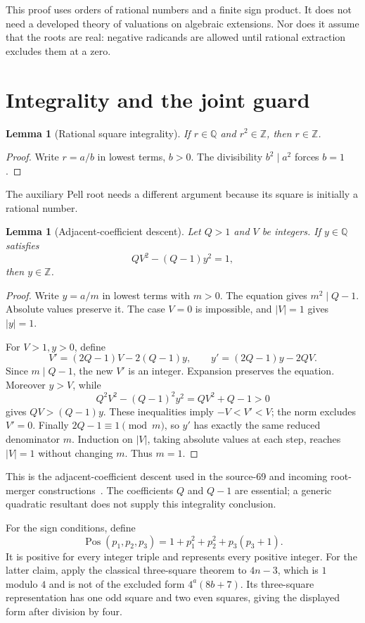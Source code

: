 \documentclass[11pt]{article}
\newtheorem{lemma}[theorem]{Lemma}
\theoremstyle{definition}
\theoremstyle{remark}
\newcommand{\Z}{\mathbb Z}
\newcommand{\Q}{\mathbb Q}
\newcommand{\Pos}{\operatorname{Pos}}
\begin{document}
This proof uses orders of rational numbers and a finite sign product.
It does not need a developed theory of valuations on algebraic
extensions. Nor does it assume that the roots are real: negative
radicands are allowed until rational extraction excludes them at a zero.

\section{Integrality and the joint guard}
\label{sec:integrality}

\begin{lemma}[Rational square integrality]\label{lem:monic}
If \(r\in\Q\) and \(r^2\in\Z\), then \(r\in\Z\).
\end{lemma}
\begin{proof}
Write \(r=a/b\) in lowest terms, \(b>0\). The divisibility
\(b^2\mid a^2\) forces \(b=1\).
\end{proof}

The auxiliary Pell root needs a different argument because its square
is initially a rational number.

\begin{lemma}[Adjacent-coefficient descent]\label{lem:descent}
Let \(Q>1\) and \(V\) be integers. If \(y\in\Q\) satisfies
\[
 QV^2-(Q-1)y^2=1,
\]
then \(y\in\Z\).
\end{lemma}
\begin{proof}
Write \(y=a/m\) in lowest terms with \(m>0\). The equation gives
\(m^2\mid Q-1\). Absolute values preserve it. The case \(V=0\) is
impossible, and \(|V|=1\) gives \(|y|=1\).

For \(V>1,y>0\), define
\[
 V'=(2Q-1)V-2(Q-1)y,\qquad
 y'=(2Q-1)y-2QV.
\]
Since \(m\mid Q-1\), the new \(V'\) is an integer. Expansion preserves
the equation. Moreover \(y>V\), while
\[
 Q^2V^2-(Q-1)^2y^2=QV^2+Q-1>0
\]
gives \(QV>(Q-1)y\). These inequalities imply \(-V<V'<V\); the norm
excludes \(V'=0\). Finally \(2Q-1\equiv1\pmod m\), so \(y'\) has exactly
the same reduced denominator \(m\). Induction on \(|V|\), taking absolute
values at each step, reaches \(|V|=1\) without changing \(m\). Thus \(m=1\).
\end{proof}

This is the adjacent-coefficient descent used in the source-69 and
incoming root-merger constructions~\cite{incomingradical}. The coefficients
\(Q\) and \(Q-1\) are essential; a generic quadratic resultant does not
supply this integrality conclusion.

For the sign conditions, define
\[
 \Pos(p_1,p_2,p_3)=1+p_1^2+p_2^2+p_3(p_3+1).
\]
It is positive for every integer triple and represents every positive
integer. For the latter claim, apply the classical three-square theorem
to \(4n-3\), which is \(1\) modulo \(4\) and is not of the excluded form
\(4^a(8b+7)\). Its three-square representation has one odd square and
two even squares, giving the displayed form after division by four.
\end{document}
